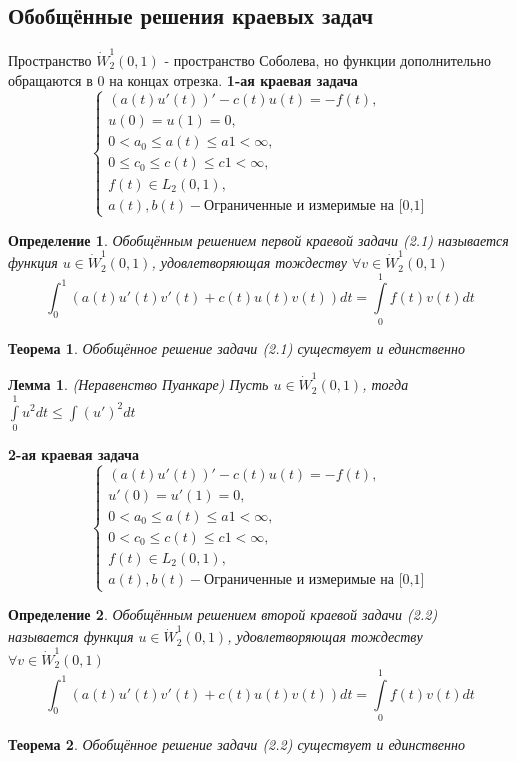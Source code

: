 \documentclass[9pt, a4paper]{extarticle}
\newtheorem{theorem}{Теорема}
\newtheorem{lemma}{Лемма}
\newtheorem{definition}{Определение}
\numberwithin{equation}{section}
\numberwithin{lemma}{section}
\numberwithin{definition}{section}
\numberwithin{notabene}{section}
\numberwithin{corollary}{section}
\begin{document}
	\subsection{Обобщённые решения краевых задач}
	Пространство $\dot{W}_2^1(0,1) $ - пространство Соболева, но функции дополнительно обращаются в 0 на концах отрезка.\newline 
	\textbf{1-ая краевая задача}
	\begin{equation}
		\begin{cases}
			\left(a(t) u'(t)\right)' - c(t) u(t) = - f(t), \\
			u(0) = u(1) = 0, \\
			0 < a_0 \leq a(t) \leq a1 < \infty, \\
			0 \leq c_0 \leq c(t) \leq c1 < \infty, \\
			f(t) \in L_2(0,1), \\
			a(t), b(t) - \text{Ограниченные и измеримые на [0,1]}
		\end{cases}		
	\end{equation}
	\begin{definition}
		Обобщённым решением первой краевой задачи (2.1) называется функция $u \in \dot{W}_2^1(0,1)$, удовлетворяющая тождеству $\forall v \in \dot{W}_2^1(0,1)$
		$$
			\int_0^1 \left(a(t) u'(t) v'(t) + c(t) u(t) v(t) \right) dt = \int\limits_0^1 f(t)v(t)dt
		$$
	\end{definition}
	\begin{theorem}
		Обобщённое решение задачи (2.1) существует и единственно
	\end{theorem}
	\begin{lemma}
		(Неравенство Пуанкаре)\newline
		Пусть $u \in \dot{W}_2^1(0,1)$, тогда $\int\limits_0^1 u^2 dt \leq \int\limits (u')^2 dt$
	\end{lemma}
	\textbf{2-ая краевая задача}
	\begin{equation}
		\begin{cases}
			\left(a(t) u'(t)\right)' - c(t) u(t) = - f(t), \\
			u'(0) = u'(1) = 0, \\
			0 < a_0 \leq a(t) \leq a1 < \infty, \\
			0 < c_0 \leq c(t) \leq c1 < \infty, \\
			f(t) \in L_2(0,1), \\
			a(t), b(t) - \text{Ограниченные и измеримые на [0,1]}
		\end{cases}		
	\end{equation}
	\begin{definition}
		Обобщённым решением второй краевой задачи (2.2) называется функция $u \in \dot{W}_2^1(0,1)$, удовлетворяющая тождеству $\forall v \in \dot{W}_2^1(0,1)$
		$$
		\int_0^1 \left(a(t) u'(t) v'(t) + c(t) u(t) v(t) \right) dt = \int\limits_0^1 f(t)v(t)dt
		$$
	\end{definition}
\begin{theorem}
	Обобщённое решение задачи (2.2) существует и единственно
\end{theorem}
\end{document}
